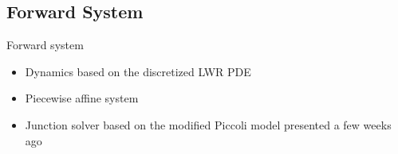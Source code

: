 \documentclass[xcolor=svgnames, english, smaller]{beamer}
\theoremstyle{plain}
\theoremstyle{definition}
\theoremstyle{plain}
\theoremstyle{plain}
\newcommand \systemDiagOffset{-1.8in}
\newcommand \systemDiagResizeMult{1.3}
\begin{document}
\subsection{Forward System}
\begin{frame}{Forward system}


\begin{figure}[t]
\hspace{\systemDiagOffset}
\resizebox{\systemDiagResizeMult\columnwidth}{!}{}
\label{fig:system}
\end{figure}

\begin{itemize}
\item Dynamics based on the discretized LWR PDE
\item Piecewise affine system
\item Junction solver based on the modified Piccoli model presented a few weeks ago
\end{itemize}
\end{frame}
\end{document}
